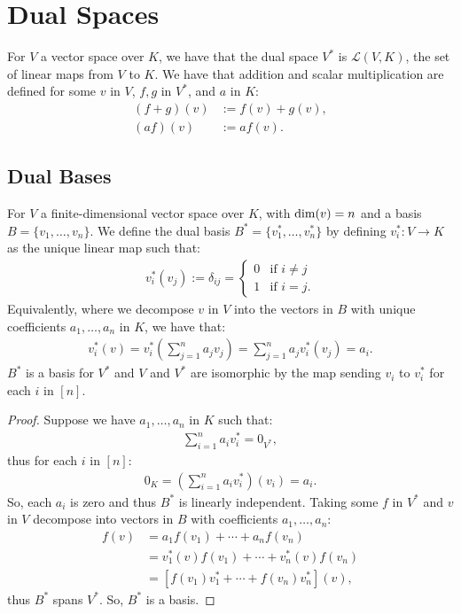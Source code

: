 \section{Dual Spaces}

For $V$ a vector space over $K$, we have that the dual space
$V^*$ is $\mathcal{L}(V, K)$, the set of linear maps from 
$V$ to $K$. We have that addition and scalar multiplication
are defined for some $v$ in $V$, $f, g$ in $V^*$, and $a$ in 
$K$: \begin{align*}
  (f + g)(v) &:= f(v) + g(v), \\
  (af)(v) &:= af(v).
\end{align*}

\subsection{Dual Bases}

For $V$ a finite-dimensional vector space over $K$, with 
$\operatorname{dim}(v) = n$ and a basis $B = \{v_1, \ldots, v_n\}$. 
We define the dual basis $B^* = \{v_1^*, \ldots, v_n^*\}$
by defining $v_i^* : V \to K$ as the unique linear map
such that: \begin{gather*}
  v_i^*(v_j) := \delta_{ij} = \begin{cases}
    0 & \text{if } i \neq j \\
    1 & \text{if } i = j.
  \end{cases}
\end{gather*}
Equivalently, where we decompose $v$ in $V$ into the vectors
in $B$ with unique coefficients $a_1, \ldots, a_n$ in $K$, we have
that: \begin{gather*}
  v_i^*(v) = v_i^*\left(\sum_{j = 1}^n a_jv_j\right) 
  = \sum_{j = 1}^n a_jv_i^*(v_j) = a_i.
\end{gather*} $B^*$ is a basis for $V^*$ and $V$ and $V^*$ are 
isomorphic by the map sending $v_i$ to $v_i^*$ for each $i$ in $[n]$.
\begin{proof}
    Suppose we have $a_1, \ldots, a_n$ in $K$ such that: \begin{gather*}
        \sum_{i = 1}^n a_i v_i^* = 0_{V^*},
    \end{gather*} thus for each $i$ in $[n]$: \begin{gather*}
        0_K = \left( \sum_{i = 1}^n a_i v_i^* \right)(v_i) = a_i.
    \end{gather*} So, each $a_i$ is zero and thus $B^*$ is
    linearly independent. Taking some $f$ in $V^*$ and
    $v$ in $V$ decompose into vectors in $B$ with coefficients
    $a_1, \ldots, a_n$: \begin{align*}
        f(v) &= a_1f(v_1) + \cdots + a_nf(v_n) \\
        &= v_1^*(v)f(v_1) + \cdots + v_n^*(v)f(v_n) \\
        &= [f(v_1)v_1^* + \cdots + f(v_n)v_n^*](v),
    \end{align*} thus $B^*$ spans $V^*$. So, $B^*$ is a basis.
\end{proof}


